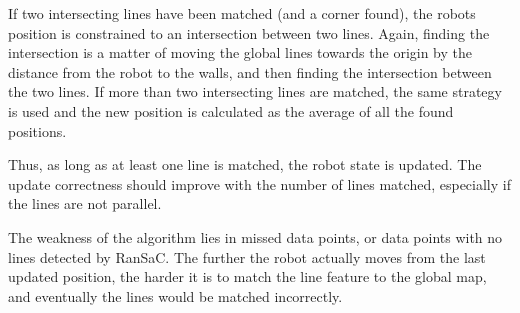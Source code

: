 If two intersecting lines have been matched (and a corner found), the robots position is constrained to
an intersection between two lines. Again, finding the intersection is a matter of moving the global
lines towards the origin by the distance from the robot to the walls,
and then finding the intersection between the two lines.
If more than two intersecting lines are matched, the same strategy is used and the new position
is calculated as the average of all the found positions.

Thus, as long as at least one line is matched, the robot state is updated.
The update correctness should improve with the number of lines matched,
especially if the lines are not parallel.

The weakness of the algorithm lies in missed data points, or data points with no lines detected by RanSaC.
The further the robot actually moves from the last updated position, the harder it is to match the line
feature to the global map, and eventually the lines would be matched incorrectly.

